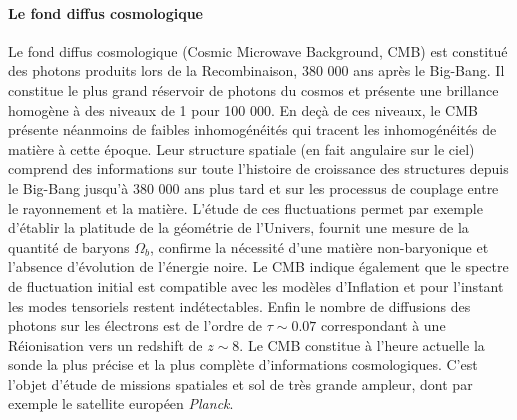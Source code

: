 \paragraph{Le fond diffus cosmologique}
Le fond diffus cosmologique (Cosmic Microwave Background, CMB) est constitué des photons produits lors de la Recombinaison, 380 000 ans après le Big-Bang. Il constitue le plus grand réservoir de photons du cosmos et présente une brillance homogène à des niveaux de 1 pour 100 000. En deçà de ces niveaux, le CMB présente néanmoins de faibles inhomogénéités qui tracent les inhomogénéités de matière à cette époque. Leur structure spatiale (en fait angulaire sur le ciel) comprend des informations sur toute l'histoire de croissance des structures depuis le Big-Bang jusqu'à 380 000 ans plus tard et sur les processus de couplage entre le rayonnement et la matière. L'étude de ces fluctuations permet par exemple d'établir la platitude de la géométrie de l'Univers, fournit une mesure de la quantité de baryons $\Omega_b$, confirme la nécessité d'une matière non-baryonique et l'absence d'évolution de l'énergie noire. Le CMB indique également que le spectre de fluctuation initial est compatible avec les modèles d'Inflation  et pour l'instant les modes tensoriels restent indétectables. Enfin le nombre de diffusions  des photons sur les électrons est de l'ordre de $\tau\sim 0.07$ correspondant à une Réionisation vers un redshift de $z\sim8$. Le CMB constitue à l'heure actuelle la sonde la plus précise et la plus complète d'informations cosmologiques. C'est l'objet d'étude de missions spatiales et sol de très grande ampleur, dont par exemple le satellite européen \textit{Planck}.


